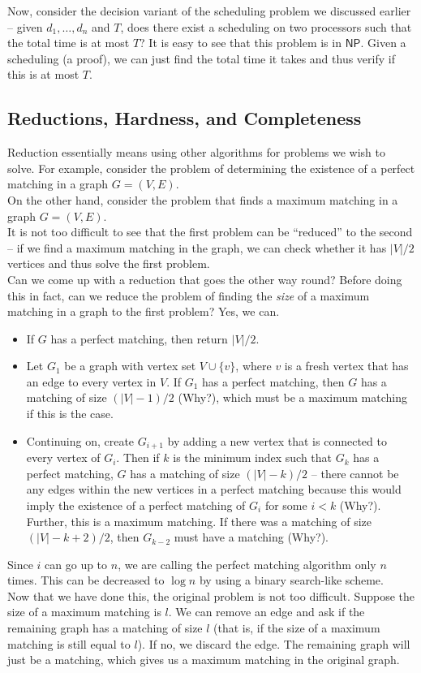 	Now, consider the decision variant of the scheduling problem we discussed earlier -- given $d_1,\ldots,d_n$ and $T$, does there exist a scheduling on two processors such that the total time is at most $T$? It is easy to see that this problem is in $\mathsf{NP}$. Given a scheduling (a proof), we can just find the total time it takes and thus verify if this is at most $T$.

\subsection{Reductions, Hardness, and Completeness}

	Reduction essentially means using other algorithms for problems we wish to solve. For example, consider the problem of determining the existence of a perfect matching in a graph $G=(V,E)$.\\
	On the other hand, consider the problem that finds a maximum matching in a graph $G=(V,E)$.\\
	It is not too difficult to see that the first problem can be ``reduced'' to the second -- if we find a maximum matching in the graph, we can check whether it has $|V|/2$ vertices and thus solve the first problem.\\
	Can we come up with a reduction that goes the other way round? Before doing this in fact, can we reduce the problem of finding the \textit{size} of a maximum matching in a graph to the first problem? Yes, we can.
	\begin{itemize}
		\item If $G$ has a perfect matching, then return $|V|/2$.
		\item Let $G_1$ be a graph with vertex set $V\cup\{v\}$, where $v$ is a fresh vertex that has an edge to every vertex in $V$. If $G_1$ has a perfect matching, then $G$ has a matching of size $(|V|-1)/2$ (Why?), which must be a maximum matching if this is the case.
		\item Continuing on, create $G_{i+1}$ by adding a new vertex that is connected to every vertex of $G_{i}$. Then if $k$ is the minimum index such that $G_k$ has a perfect matching, $G$ has a matching of size $(|V|-k)/2$ -- there cannot be any edges within the new vertices in a perfect matching because this would imply the existence of a perfect matching of $G_i$ for some $i<k$ (Why?). Further, this is a maximum matching. If there was a matching of size $(|V|-k+2)/2$, then $G_{k-2}$ must have a matching (Why?).
	\end{itemize}
	Since $i$ can go up to $n$, we are calling the perfect matching algorithm only $n$ times. This can be decreased to $\log n$ by using a binary search-like scheme.\\
	Now that we have done this, the original problem is not too difficult. Suppose the size of a maximum matching is $l$. We can remove an edge and ask if the remaining graph has a matching of size $l$ (that is, if the size of a maximum matching is still equal to $l$). If no, we discard the edge. The remaining graph will just be a matching, which gives us a maximum matching in the original graph.\\

